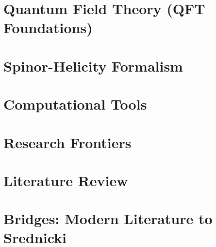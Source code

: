 


\maketitle
\tableofcontents
\newpage

\part{Quantum Field Theory (QFT Foundations)}



\part{Spinor-Helicity Formalism}




\part{Computational Tools}


\part{Research Frontiers}


\part{Literature Review}


\part{Bridges: Modern Literature to Srednicki}



